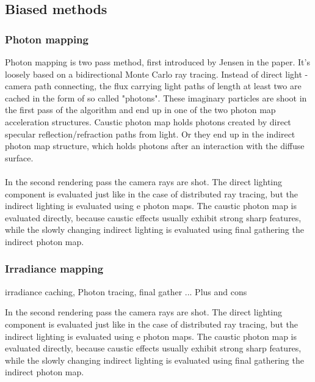 \subsection{Biased methods}


\subsubsection{Photon mapping}
Photon mapping is two pass method, first introduced by Jensen in the \cite{Jensen:1996} paper. It's loosely based on a bidirectional Monte Carlo ray tracing. Instead of direct light - camera path connecting, the flux carrying light paths of length at least two are cached in the form of so called "photons". These imaginary particles are shoot in the first pass of the algorithm and end up in one of the two photon map acceleration structures. Caustic photon map holds photons created by direct specular reflection/refraction paths from light. Or they end up in the indirect photon map structure, which holds photons after an interaction with the diffuse surface.
\\
\\
In the second rendering pass the camera rays are shot. The direct lighting component is
evaluated just like in the case of distributed ray tracing, but the indirect lighting is evaluated
using e photon maps. The caustic photon map is evaluated directly, because caustic effects
usually exhibit strong sharp features, while the slowly changing indirect lighting is evaluated
using final gathering the indirect photon map.


\subsubsection{Irradiance mapping}
\cite{jarosz08thesis} %
irradiance caching, Photon tracing, final gather ...
Plus and cons



In the second rendering pass the camera rays are shot. The direct lighting component is evaluated just like in the case of distributed ray tracing, but the indirect lighting is evaluated using e photon maps. The caustic photon map is evaluated directly, because caustic effects usually exhibit strong sharp features, while the slowly changing indirect lighting is evaluated using final gathering the indirect photon map.


